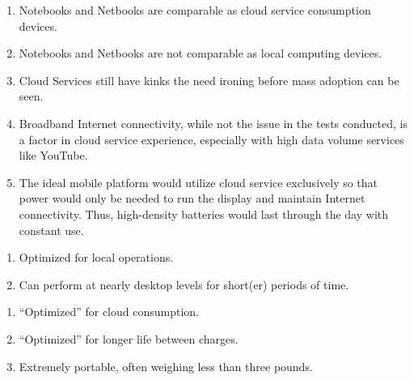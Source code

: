 \documentclass[letterpaper]{article}
\begin{document}
{\begin{center}
\end{center}

\begin{enumerate}

\item Notebooks and Netbooks are comparable as cloud service consumption
  devices.

\item Notebooks and Netbooks are not comparable as local computing devices.

\item Cloud Services still have kinks the need ironing before mass adoption can
  be seen.

\item Broadband Internet connectivity, while not the issue in the tests
  conducted, is a factor in cloud service experience, especially with high data
  volume services like YouTube.

\item The ideal mobile platform would utilize cloud service exclusively so that
  power would only be needed to run the display and maintain Internet
  connectivity.  Thus, high-density batteries would last through the day with
  constant use.

\end{enumerate}

\newpage


\begin{enumerate}

\item Optimized for local operations.

\item Can perform at nearly desktop levels for short(er) periods of time.

\end{enumerate}

\newpage

\begin{enumerate}


\item ``Optimized'' for cloud consumption.

\item ``Optimized'' for longer life between charges.

\item Extremely portable, often weighing less than three pounds.

\end{enumerate}

}
\end{document}
